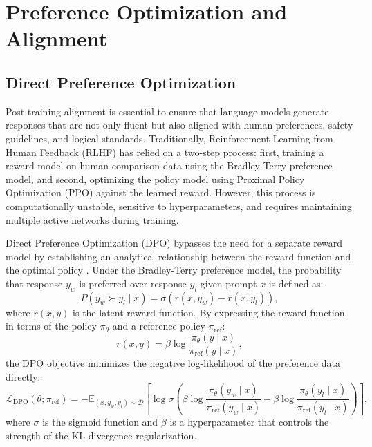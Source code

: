\section{Preference Optimization and Alignment}

\subsection{Direct Preference Optimization}

Post-training alignment is essential to ensure that language models generate responses that are not only fluent but also aligned with human preferences, safety guidelines, and logical standards. Traditionally, Reinforcement Learning from Human Feedback (RLHF) has relied on a two-step process: first, training a reward model on human comparison data using the Bradley-Terry preference model, and second, optimizing the policy model using Proximal Policy Optimization (PPO) against the learned reward. However, this process is computationally unstable, sensitive to hyperparameters, and requires maintaining multiple active networks during training.

Direct Preference Optimization (DPO) bypasses the need for a separate reward model by establishing an analytical relationship between the reward function and the optimal policy \parencite{rafailov2024directpreferenceoptimizationlanguage}. Under the Bradley-Terry preference model, the probability that response $y_w$ is preferred over response $y_l$ given prompt $x$ is defined as:
\begin{equation}
    P(y_w \succ y_l \mid x) = \sigma(r(x, y_w) - r(x, y_l)),
\end{equation}
where $r(x, y)$ is the latent reward function. By expressing the reward function in terms of the policy $\pi_\theta$ and a reference policy $\pi_{\text{ref}}$:
\begin{equation}
    r(x, y) = \beta \log \frac{\pi_\theta(y \mid x)}{\pi_{\text{ref}}(y \mid x)},
\end{equation}
the DPO objective minimizes the negative log-likelihood of the preference data directly:
\begin{equation}
    \mathcal{L}_{\text{DPO}}(\theta; \pi_{\text{ref}}) = -\mathbb{E}_{(x, y_w, y_l) \sim \mathcal{D}} \left[ \log \sigma \left( \beta \log \frac{\pi_\theta(y_w \mid x)}{\pi_{\text{ref}}(y_w \mid x)} - \beta \log \frac{\pi_\theta(y_l \mid x)}{\pi_{\text{ref}}(y_l \mid x)} \right) \right],
\end{equation}
where $\sigma$ is the sigmoid function and $\beta$ is a hyperparameter that controls the strength of the KL divergence regularization. 

